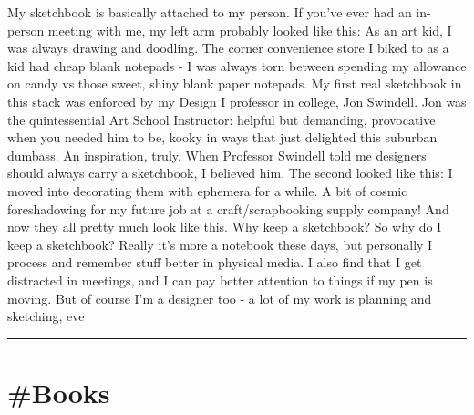\documentclass[10pt,a4paper]{article}
\begin{document}
\begin{multicols*}{2}
My sketchbook is basically attached to my person. If you’ve ever had an in-person meeting with me, my left arm probably looked like this:
As an art kid, I was always drawing and doodling. The corner convenience store I biked to as a kid had cheap blank notepads - I was always torn between spending my allowance on candy vs those sweet, shiny blank paper notepads.
My first real sketchbook in this stack was enforced by my Design I professor in college, Jon Swindell. Jon was the quintessential Art School Instructor: helpful but demanding, provocative when you needed him to be, kooky in ways that just delighted this suburban dumbass. An inspiration, truly.
When Professor Swindell told me designers should always carry a sketchbook, I believed him.
The second looked like this: I moved into decorating them with ephemera for a while. A bit of cosmic foreshadowing for my future job at a craft/scrapbooking supply company!
And now they all pretty much look like this.
Why keep a sketchbook?
So why do I keep a sketchbook? Really it’s more a notebook these days, but personally I process and remember stuff better in physical media. I also find that I get distracted in meetings, and I can pay better attention to things if my pen is moving.
But of course I’m a designer too - a lot of my work is planning and sketching, eve
\par\noindent\textcolor{red}{\rule{\linewidth}{0.2mm}}
\vfill
\null
\end{multicols*}

\newpage
\section{\#Books}
\end{document}
